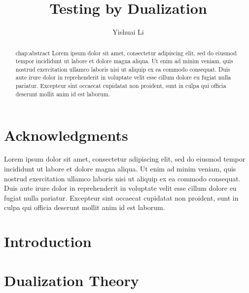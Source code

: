 \documentclass[12pt,oneside,reqno]{amsbook}
\title{Testing by Dualization}
\author{Yishuai Li}
\theoremstyle{definition}
\numberwithin{section}{chapter}
\numberwithin{figure}{chapter}
\numberwithin{equation}{chapter}
\numberwithin{definition}{chapter}
\begin{document}
\frontmatter

\maketitle

\copyrightpage

\chapter*{Acknowledgments}
\label{chap:acknowledgments}

Lorem ipsum dolor sit amet, consectetur adipiscing elit, sed do eiusmod tempor
incididunt ut labore et dolore magna aliqua. Ut enim ad minim veniam, quis
nostrud exercitation ullamco laboris nisi ut aliquip ex ea commodo
consequat. Duis aute irure dolor in reprehenderit in voluptate velit esse cillum
dolore eu fugiat nulla pariatur. Excepteur sint occaecat cupidatat non proident,
sunt in culpa qui officia deserunt mollit anim id est laborum.


\begin{abstract}{chap:abstract}
  Lorem ipsum dolor sit amet, consectetur adipiscing elit, sed do eiusmod tempor
  incididunt ut labore et dolore magna aliqua. Ut enim ad minim veniam, quis
  nostrud exercitation ullamco laboris nisi ut aliquip ex ea commodo
  consequat. Duis aute irure dolor in reprehenderit in voluptate velit esse
  cillum dolore eu fugiat nulla pariatur. Excepteur sint occaecat cupidatat non
  proident, sunt in culpa qui officia deserunt mollit anim id est laborum.
\end{abstract}

\tableofcontents
\listoffigures

\mainmatter

\chapter{Introduction}
\label{chap:introduction}


\chapter{Dualization Theory}
\label{chap:theory}

\end{document}
